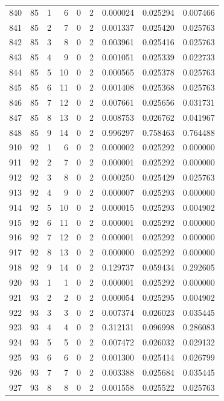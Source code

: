 \begin{longtable}{rrrrrrrrr}
840 & 85 & 1 & 6 & 0 & 2 & 0.000024 & 0.025294 & 0.007466 \\
841 & 85 & 2 & 7 & 0 & 2 & 0.001337 & 0.025420 & 0.025763 \\
842 & 85 & 3 & 8 & 0 & 2 & 0.003961 & 0.025416 & 0.025763 \\
843 & 85 & 4 & 9 & 0 & 2 & 0.001051 & 0.025339 & 0.022733 \\
844 & 85 & 5 & 10 & 0 & 2 & 0.000565 & 0.025378 & 0.025763 \\
845 & 85 & 6 & 11 & 0 & 2 & 0.001408 & 0.025368 & 0.025763 \\
846 & 85 & 7 & 12 & 0 & 2 & 0.007661 & 0.025656 & 0.031731 \\
847 & 85 & 8 & 13 & 0 & 2 & 0.008753 & 0.026762 & 0.041967 \\
848 & 85 & 9 & 14 & 0 & 2 & 0.996297 & 0.758463 & 0.764488 \\
910 & 92 & 1 & 6 & 0 & 2 & 0.000002 & 0.025292 & 0.000000 \\
911 & 92 & 2 & 7 & 0 & 2 & 0.000001 & 0.025292 & 0.000000 \\
912 & 92 & 3 & 8 & 0 & 2 & 0.000250 & 0.025429 & 0.025763 \\
913 & 92 & 4 & 9 & 0 & 2 & 0.000007 & 0.025293 & 0.000000 \\
914 & 92 & 5 & 10 & 0 & 2 & 0.000015 & 0.025293 & 0.004902 \\
915 & 92 & 6 & 11 & 0 & 2 & 0.000001 & 0.025292 & 0.000000 \\
916 & 92 & 7 & 12 & 0 & 2 & 0.000001 & 0.025292 & 0.000000 \\
917 & 92 & 8 & 13 & 0 & 2 & 0.000000 & 0.025292 & 0.000000 \\
918 & 92 & 9 & 14 & 0 & 2 & 0.129737 & 0.059434 & 0.292605 \\
920 & 93 & 1 & 1 & 0 & 2 & 0.000001 & 0.025292 & 0.000000 \\
921 & 93 & 2 & 2 & 0 & 2 & 0.000054 & 0.025295 & 0.004902 \\
922 & 93 & 3 & 3 & 0 & 2 & 0.007374 & 0.026023 & 0.035445 \\
923 & 93 & 4 & 4 & 0 & 2 & 0.312131 & 0.096998 & 0.286083 \\
924 & 93 & 5 & 5 & 0 & 2 & 0.007472 & 0.026032 & 0.029132 \\
925 & 93 & 6 & 6 & 0 & 2 & 0.001300 & 0.025414 & 0.026799 \\
926 & 93 & 7 & 7 & 0 & 2 & 0.003388 & 0.025684 & 0.035445 \\
927 & 93 & 8 & 8 & 0 & 2 & 0.001558 & 0.025522 & 0.025763 \\

\end{longtable}
